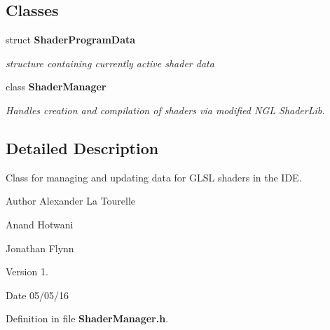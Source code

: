 \subsection*{Classes}
\begin{DoxyCompactItemize}
\item 
struct {\bf Shader\-Program\-Data}
\begin{DoxyCompactList}\small\item\em structure containing currently active shader data \end{DoxyCompactList}\item 
class {\bf Shader\-Manager}
\begin{DoxyCompactList}\small\item\em Handles creation and compilation of shaders via modified N\-G\-L Shader\-Lib. \end{DoxyCompactList}\end{DoxyCompactItemize}


\subsection{Detailed Description}
Class for managing and updating data for G\-L\-S\-L shaders in the I\-D\-E. \begin{DoxyAuthor}{Author}
Alexander La Tourelle 

Anand Hotwani 

Jonathan Flynn 
\end{DoxyAuthor}
\begin{DoxyVersion}{Version}
1. 
\end{DoxyVersion}
\begin{DoxyDate}{Date}
05/05/16 
\end{DoxyDate}


Definition in file {\bf Shader\-Manager.\-h}.

